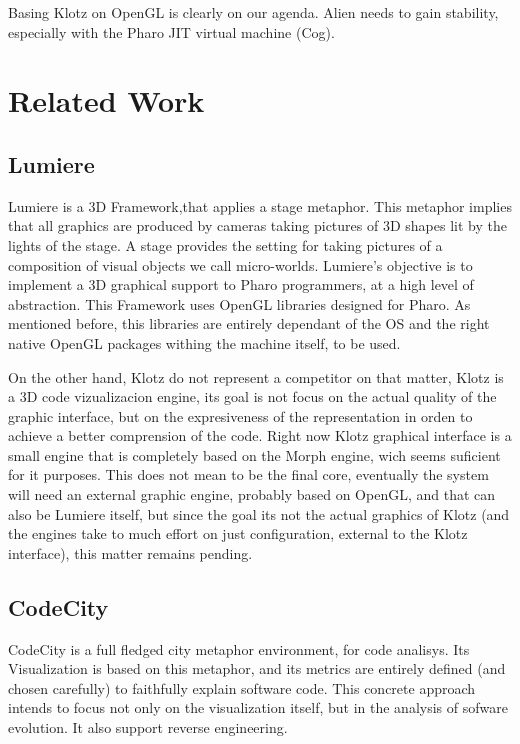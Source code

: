 \documentclass{sig-alternate}
\newcommand{\rj}[1]{\nb{Ricardo}{green}{#1}}
\newcommand{\seclabel}[1]{\label{sec:#1}}
\begin{document}
Basing Klotz on OpenGL is clearly on our agenda. Alien needs to gain stability, especially with the Pharo JIT virtual machine (Cog).

\section{Related Work} \seclabel{relatedwork}

\subsection{Lumiere~\cite{Oliv09a}}
Lumiere is a 3D Framework,that applies a stage metaphor.
This metaphor implies that all graphics are produced by cameras
taking pictures of 3D shapes lit by the lights of the stage. A
stage provides the setting for taking pictures of a composition 
of visual objects we call micro-worlds. Lumiere's objective
is to implement a 3D graphical support to Pharo programmers, at
a high level of abstraction. This Framework uses OpenGL libraries
designed for Pharo. As mentioned before, this libraries are 
entirely dependant of the OS and the right native OpenGL packages
withing the machine itself, to be used.

On the other hand, Klotz do not represent a competitor on that 
matter, Klotz is a 3D code vizualizacion engine, its goal is
not focus on the actual quality of the graphic interface, but 
on the expresiveness of the representation in orden to achieve
a better comprension of the code. Right now Klotz graphical
interface is a small engine that is completely based on the Morph
engine, wich seems suficient for it  purposes. This does not
mean to be the final core, eventually the system will need an
external graphic engine, probably based on OpenGL, and that can
also be Lumiere itself, but since the goal its not the actual
graphics of Klotz (and the engines take to much effort on just
configuration, external to the Klotz interface), this matter
remains pending.

\subsection{CodeCity~\cite{Wett08d}}\rj{ just changed this}
CodeCity is a full fledged city metaphor environment, for code
analisys. Its Visualization is based on this metaphor, and its
metrics are entirely defined (and chosen carefully) to faithfully
explain software code. This concrete approach intends to focus
not only on the visualization itself, but in the analysis of sofware
evolution. It also support  reverse engineering.
\end{document}
